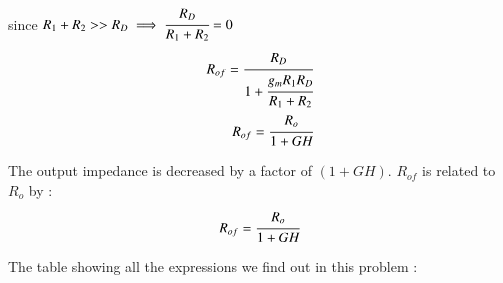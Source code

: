 \begin{enumerate}[label=\thesubsection.\arabic*.,ref=\thesubsection.\theenumi]
since $R_{1}+R_{2}>>R_{D} \implies \cfrac{R_{D}}{R_{1}+R_{2}} = 0$\\

\begin{align}
R_{of} = \cfrac{R_{D}}{1 + \cfrac{ g_{m}R_{1}R_{D}}{R_{1}+R_{2}}}\\
R_{of} = \cfrac{R_{o}}{1 + GH}
\end{align}

The output impedance is decreased by a factor of $(1+GH)$.
$R_{of}$ is related to $R_{o}$ by :\\
\begin{align}
R_{of} = \cfrac{R_{o}}{1 + GH}
\end{align}


The table showing all the expressions we find out in this problem :

\begin{table}[!ht]
\centering

\caption{}
\label{table}
\end{table}


\end{enumerate}
